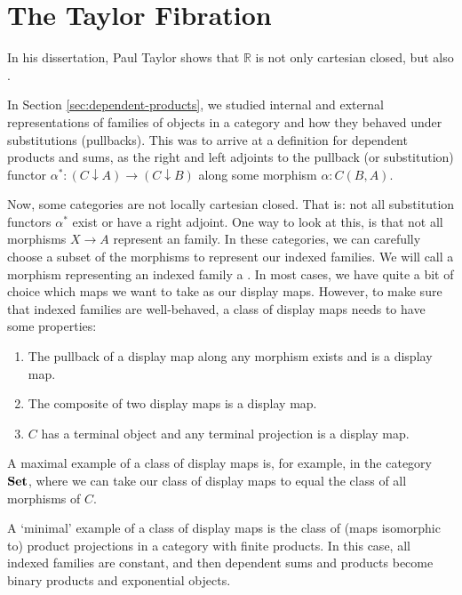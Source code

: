 \section{The Taylor Fibration}

In his dissertation, Paul Taylor shows that $ \mathbb R $ is not only cartesian closed, but also .

In Section \ref{sec:dependent-products}, we studied internal and external representations of families of objects in a category and how they behaved under substitutions (pullbacks). This was to arrive at a definition for dependent products and sums, as the right and left adjoints to the pullback (or substitution) functor $ \alpha^*: (C \downarrow A) \to (C \downarrow B) $ along some morphism $ \alpha : C(B, A) $.

Now, some categories are not locally cartesian closed. That is: not all substitution functors $ \alpha^* $ exist or have a right adjoint. One way to look at this, is that not all morphisms $ X \to A $ represent an family. In these categories, we can carefully choose a subset of the morphisms to represent our indexed families. We will call a morphism representing an indexed family a . In most cases, we have quite a bit of choice which maps we want to take as our display maps. However, to make sure that indexed families are well-behaved, a class of display maps needs to have some properties:
\begin{enumerate}
  \item The pullback of a display map along any morphism exists and is a display map.
  \item The composite of two display maps is a display map.
  \item $ C $ has a terminal object and any terminal projection is a display map.
\end{enumerate}
\begin{remark}
  A maximal example of a class of display maps is, for example, in the category $ \mathbf{Set} $, where we can take our class of display maps to equal the class of all morphisms of $ C $.
\end{remark}
\begin{remark}
  A `minimal' example of a class of display maps is the class of (maps isomorphic to) product projections in a category with finite products. In this case, all indexed families are constant, and then dependent sums and products become binary products and exponential objects.
\end{remark}

